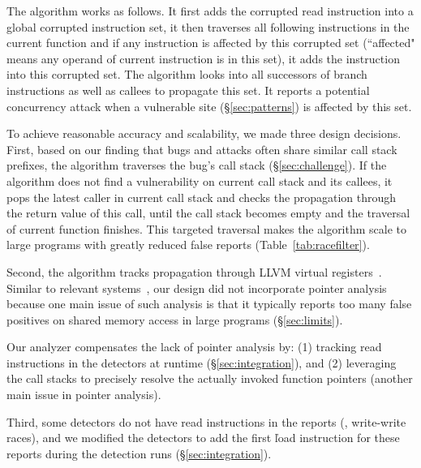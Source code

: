 The algorithm works as follows. It first adds the corrupted read
instruction into a global corrupted instruction set, it then traverses all
following instructions in the current function and if any instruction is affected
by this corrupted set (``affected" means any operand of current instruction
is in this set), it adds the instruction into this corrupted set.
The algorithm looks into all successors of branch instructions as well as
callees to propagate this set. It reports a potential concurrency attack when a
vulnerable site (\S\ref{sec:patterns}) is affected by this set.

To achieve reasonable accuracy and scalability, we made three design decisions. 
First, based on our finding that bugs and attacks often share similar call 
stack prefixes, the algorithm traverses the bug's call stack 
(\S\ref{sec:challenge}). If the algorithm does not find a vulnerability on 
current call stack and its callees, it pops the latest caller in current call 
stack and checks the propagation through the return value of this call, until 
the call stack becomes empty and the traversal of current function finishes. 
This targeted traversal makes the algorithm scale to large programs with 
greatly reduced false reports (Table~\ref{tab:racefilter}).

Second, the algorithm tracks propagation through LLVM virtual 
registers~\cite{llvm}. Similar to relevant
systems~\cite{conseq:asplos11,gist:sosp15}, our 
design did not incorporate pointer analysis~\cite{bddbddb, dsa:pldi07} 
because one main issue of such analysis is that it typically reports
too many false positives on shared memory access in large programs
(\S\ref{sec:limits}).

Our analyzer compensates the lack of pointer analysis by:
(1) tracking read instructions in the detectors at runtime 
(\S\ref{sec:integration}), and (2) leveraging the call stacks to precisely 
resolve the actually invoked function pointers (another main issue in pointer 
analysis).

Third, some detectors do not have read instructions in the reports (\eg, 
write-write races), and we modified the detectors to add the first \v{load} 
instruction for these reports during the detection runs 
(\S\ref{sec:integration}).

